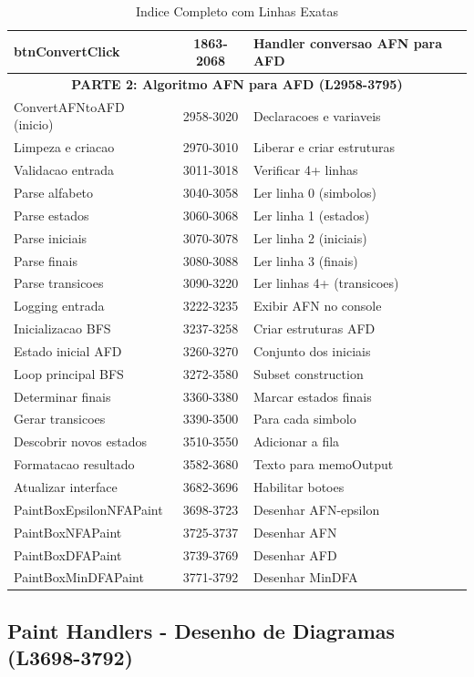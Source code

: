 \documentclass[12pt,a4paper]{article}
\begin{document}
\begin{table}[ht]
\begin{tabular}{|l|c|p{5cm}|}
btnConvertClick & 1863-2068 & Handler conversao AFN para AFD \\
\hline
\multicolumn{3}{|c|}{\textbf{PARTE 2: Algoritmo AFN para AFD (L2958-3795)}} \\
\hline
ConvertAFNtoAFD (inicio) & 2958-3020 & Declaracoes e variaveis \\
Limpeza e criacao & 2970-3010 & Liberar e criar estruturas \\
Validacao entrada & 3011-3018 & Verificar 4+ linhas \\
Parse alfabeto & 3040-3058 & Ler linha 0 (simbolos) \\
Parse estados & 3060-3068 & Ler linha 1 (estados) \\
Parse iniciais & 3070-3078 & Ler linha 2 (iniciais) \\
Parse finais & 3080-3088 & Ler linha 3 (finais) \\
Parse transicoes & 3090-3220 & Ler linhas 4+ (transicoes) \\
Logging entrada & 3222-3235 & Exibir AFN no console \\
Inicializacao BFS & 3237-3258 & Criar estruturas AFD \\
Estado inicial AFD & 3260-3270 & Conjunto dos iniciais \\
Loop principal BFS & 3272-3580 & Subset construction \\
Determinar finais & 3360-3380 & Marcar estados finais \\
Gerar transicoes & 3390-3500 & Para cada simbolo \\
Descobrir novos estados & 3510-3550 & Adicionar a fila \\
Formatacao resultado & 3582-3680 & Texto para memoOutput \\
Atualizar interface & 3682-3696 & Habilitar botoes \\
PaintBoxEpsilonNFAPaint & 3698-3723 & Desenhar AFN-epsilon \\
PaintBoxNFAPaint & 3725-3737 & Desenhar AFN \\
PaintBoxDFAPaint & 3739-3769 & Desenhar AFD \\
PaintBoxMinDFAPaint & 3771-3792 & Desenhar MinDFA \\
\hline
\end{tabular}
\caption{Indice Completo com Linhas Exatas}
\end{table}

\subsection{Paint Handlers - Desenho de Diagramas (L3698-3792)}
\end{document}
